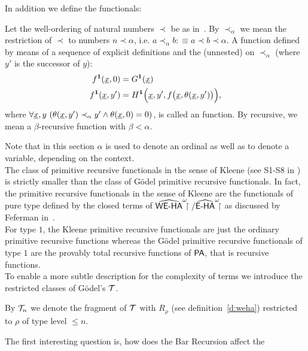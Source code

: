 In addition we define the  functionals:
\begin{dfn}\label{d:ordRec}
Let the well-ordering of natural numbers $\prec$ be as in~\cite{Schuette60}. By
$\prec_\alpha$ we mean the restriction of $\prec$ to numbers
$n\prec\alpha$, i.e. $a\prec_\alpha b :\equiv a\prec b\prec \alpha$. 
A function defined by means of a sequence of explicit definitions
and the (unnested)  
on $\prec_\alpha$ (where $y'$ is the successor of $y$):
\setcounter{equation}{0}
\begin{align}
f^\mathbf{1}(\underline x, 0)  &= G^\mathbf{1}(\underline x)\\
f^\mathbf{1}(\underline x, y') &= H^\mathbf{1}\Big(\underline x,y',f\big(\underline x,\theta(\underline x, y')\big)\Big)\text{,}
\end{align}
where $\forall \underline x,y\ (\theta(\underline x, y')\prec_\alpha y'\wedge\theta(\underline x, 0)=0)$,
is called an  function. By \lOrdm{\alpha}re\-cur\-sive, we
mean a $\beta$-recursive function with $\beta<\alpha$.
\end{dfn}
Note that in this section $\alpha$ is used to denote an ordinal as well as to denote a variable,
depending on the context.\\
The class of  primitive recursive functionals in the sense 
of Kleene (see S1-S8 in \cite{Kleene59}) is strictly
smaller than the class of G\"odel primitive recursive functionals. In fact,
the primitive recursive functionals in the sense of Kleene are 
the functionals of pure type defined by the closed terms of $\widehat{\textsf{\upshape WE-HA}}^\omega\!\!\!\restriction/\widehat{\textsf{\upshape E-HA}}^\omega\!\!\!\restriction$ 
as discussed by Feferman in~\cite{Feferman77}.\\
For type $1$, the Kleene primitive recursive functionals are just the 
ordinary primitive recursive functions whereas the G\"odel primitive recursive
functionals of type $1$ are the provably total recursive functions of $\textsf{\upshape PA}$, that is
recursive functions.\\
To enable a more subtle description for the complexity of terms we introduce
the restricted classes of G\"odel's $\mathcal{T}$.
%
\begin{dfn}[$\T_n$]\label{d:GTn}
By $\T_n$ we denote the fragment of $\mathcal{T}$ with $R_\rho$ (see definition~\ref{d:weha})
restricted to $\rho$ of type level $\leq n$.
\end{dfn}
%
The first interesting question is, how does the Bar Recursion affect the 
